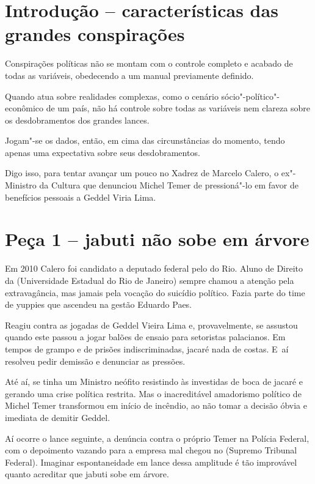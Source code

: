  

\section{Introdução -- características das grandes conspirações}

Conspirações políticas não se montam com o controle completo e acabado
de todas as variáveis, obedecendo a um manual previamente definido.

Quando atua sobre realidades complexas, como o cenário
sócio"-político"-econômico de um país, não há controle sobre todas as
variáveis nem clareza sobre os desdobramentos dos grandes lances.

Jogam"-se os dados, então, em cima das circunstâncias do momento, tendo
apenas uma expectativa sobre seus desdobramentos.

Digo isso, para tentar avançar um pouco no Xadrez de Marcelo Calero, o
ex"-Ministro da Cultura que denunciou Michel Temer de pressioná"-lo em
favor de benefícios pessoais a Geddel Viria Lima.

\section{Peça 1 -- jabuti não sobe em árvore}

Em 2010 Calero foi candidato a deputado federal pelo  do Rio. Aluno
de Direito da  (Universidade Estadual do Rio de Janeiro) sempre
chamou a atenção pela extravagância, mas jamais pela vocação do suicídio
político. Fazia parte do time de yuppies que ascendeu na gestão Eduardo
Paes.

Reagiu contra as jogadas de Geddel Vieira Lima e, provavelmente, se
assustou quando este passou a jogar balões de ensaio para setoristas
palacianos. Em tempos de grampo e de prisões indiscriminadas, jacaré
nada de costas. E~aí resolveu pedir demissão e denunciar as pressões.

Até aí, se tinha um Ministro neófito resistindo às investidas de boca de
jacaré e gerando uma crise política restrita. Mas o inacreditável
amadorismo político de Michel Temer transformou em início de incêndio,
ao não tomar a decisão óbvia e imediata de demitir Geddel.

Aí ocorre o lance seguinte, a denúncia contra o próprio Temer na Polícia
Federal, com o depoimento vazando para a empresa mal chegou no 
(Supremo Tribunal Federal). Imaginar espontaneidade em lance dessa
amplitude é tão improvável quanto acreditar que jabuti sobe em árvore.

